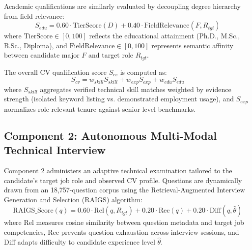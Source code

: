\documentclass[conference]{IEEEtran}
\begin{document}
Academic qualifications are similarly evaluated by decoupling degree hierarchy from field relevance:
\begin{equation}
S_{edu} = 0.60 \cdot \text{TierScore}(D) + 0.40 \cdot \text{FieldRelevance}(F, R_{tgt})
\end{equation}
where $\text{TierScore} \in [0, 100]$ reflects the educational attainment (Ph.D., M.Sc., B.Sc., Diploma), and $\text{FieldRelevance} \in [0, 100]$ represents semantic affinity between candidate major $F$ and target role $R_{tgt}$.

The overall CV qualification score $S_{cv}$ is computed as:
\begin{equation}
S_{cv} = w_{skill} S_{skill} + w_{exp} S_{exp} + w_{edu} S_{edu}
\end{equation}
where $S_{skill}$ aggregates verified technical skill matches weighted by evidence strength (isolated keyword listing vs. demonstrated employment usage), and $S_{exp}$ normalizes role-relevant tenure against senior-level benchmarks.

\subsection{Component 2: Autonomous Multi-Modal Technical Interview}
Component 2 administers an adaptive technical examination tailored to the candidate's target job role and observed CV profile. Questions are dynamically drawn from an 18,757-question corpus using the Retrieval-Augmented Interview Generation and Selection (RAIGS) algorithm:
\begin{equation}
\text{RAIGS\_Score}(q) = 0.60 \cdot \text{Rel}(q, R_{tgt}) + 0.20 \cdot \text{Rec}(q) + 0.20 \cdot \text{Diff}(q, \hat{\theta})
\end{equation}
where $\text{Rel}$ measures cosine similarity between question metadata and target job competencies, $\text{Rec}$ prevents question exhaustion across interview sessions, and $\text{Diff}$ adapts difficulty to candidate experience level $\hat{\theta}$.
\end{document}
